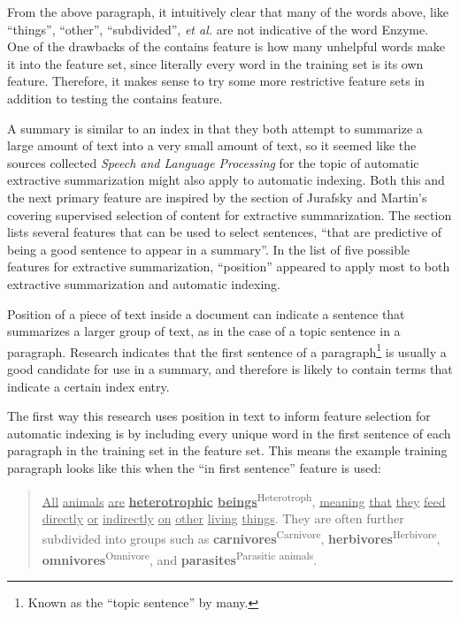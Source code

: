 From the above paragraph, it intuitively clear that many of the words above, like ``things'', ``other'', ``subdivided'', {\it et al.} are not indicative of the word Enzyme.
One of the drawbacks of the contains feature is how many unhelpful words make it into the feature set, since literally every word in the training set is its own feature.
Therefore, it makes sense to try some more restrictive feature sets in addition to testing the contains feature.


A summary is similar to an index in that they both attempt to summarize a large amount of text into a very small amount of text, so it seemed like the sources collected {\it Speech and Language Processing} for the topic of automatic extractive summarization might also apply to automatic indexing.
Both this and the next primary feature are inspired by the section of Jurafsky and Martin's covering supervised selection of content for extractive summarization.
The section lists several features that can be used to select sentences, ``that are predictive of being a good sentence to appear in a summary''.
In the list of five possible features for extractive summarization, ``position'' appeared to apply most to both extractive summarization and automatic indexing.

Position of a piece of text inside a document can indicate a sentence that summarizes a larger group of text, as in the case of a topic sentence in a paragraph.
Research indicates that the first sentence of a paragraph\footnote{Known as the ``topic sentence'' by many.} is usually a good candidate for use in a summary, and therefore is likely to contain terms that indicate a certain index entry\cite{jurafsky}.

The first way this research uses position in text to inform feature selection for automatic indexing is by including every unique word in the first sentence of each paragraph in the training set in the feature set.
This means the example training paragraph looks like this when the ``in first sentence'' feature is used:

\begin{quote}
\underline{All} \underline{animals} \underline{are} {\bf \underline{heterotrophic} \underline{beings}}\textsuperscript{Heterotroph}, \underline{meaning} \underline{that} \underline{they} \underline{feed} \underline{directly} \underline{or} \underline{indirectly} \underline{on} \underline{other} \underline{living} \underline{things}. They are often further subdivided into groups such as {\bf carnivores}\textsuperscript{Carnivore}, {\bf herbivores}\textsuperscript{Herbivore}, {\bf omnivores}\textsuperscript{Omnivore}, and {\bf parasites}\textsuperscript{Parasitic animals}.
\end{quote} 

